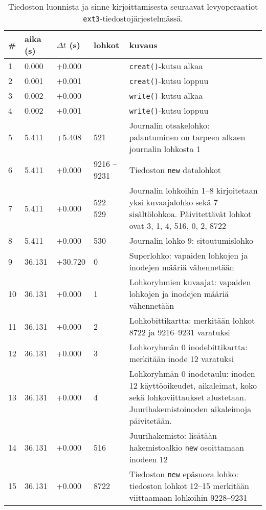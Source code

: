 \begin{table}[H]
\centering
\begin{tabular}{l | l | l | l | p{7cm}}
    \# & aika (s) & $\Delta t$ (s) & lohkot & kuvaus \\ \hline \hline
    1  & 0.000    & +0.000   &              & \texttt{creat()}-kutsu alkaa   \\ \hline %
    2  & 0.001    & +0.001   &              & \texttt{creat()}-kutsu loppuu  \\ \hline %
    3  & 0.002    & +0.000   &              & \texttt{write()}-kutsu alkaa   \\ \hline %
    4  & 0.002    & +0.001   &              & \texttt{write()}-kutsu loppuu  \\ \hline %
    5  & 5.411    & +5.408   & 521          & Journalin otsakelohko: palautuminen on tarpeen alkaen journalin lohkosta 1                       \\ \hline %
    6  & 5.411    & +0.000   & 9216 -- 9231 & Tiedoston \texttt{new} datalohkot                               \\ \hline %
    7  & 5.411    & +0.000   & 522 -- 529   & Journalin lohkoihin 1--8 kirjoitetaan yksi kuvaajalohko sekä 7 sisältölohkoa. Päivitettävät lohkot ovat 3, 1, 4, 516, 0, 2, 8722                       \\ \hline %
    8  & 5.411    & +0.000   & 530          & Journalin lohko 9: sitoutumislohko                       \\ \hline %
    9  & 36.131   & +30.720  & 0            & Superlohko: vapaiden lohkojen ja inodejen määriä vähennetään                     \\ \hline %
    10 & 36.131   & +0.000   & 1            & Lohkoryhmien kuvaajat: vapaiden lohkojen ja inodejen määriä vähennetään                     \\ \hline %
    11 & 36.131   & +0.000   & 2            & Lohkobittikartta: merkitään lohkot 8722 ja 9216--9231 varatuksi                     \\ \hline %
    12 & 36.131   & +0.000   & 3            & Lohkoryhmän 0 inodebittikartta: merkitään inode 12 varatuksi \\ \hline %
    13 & 36.131   & +0.000   & 4            & Lohkoryhmän 0 inodetaulu: inoden 12 käyttöoikeudet, aikaleimat, koko sekä lohkoviittaukset alustetaan. Juurihakemistoinoden aikaleimoja päivitetään.                      \\ \hline %
    14 & 36.131   & +0.000   & 516          & Juurihakemisto: lisätään hakemistoalkio \texttt{new} osoittamaan inodeen 12                 \\ \hline %
    15 & 36.131   & +0.000   & 8722         & Tiedoston \texttt{new} epäsuora lohko: tiedoston lohkot 12--15 merkitään viittaamaan lohkoihin 9228--9231 \\        %
\end{tabular}
\caption{Tiedoston luonnista ja sinne kirjoittamisesta seuraavat levyoperaatiot \texttt{ext3}-tiedostojärjestelmässä.}
\label{TabExt3CreatAndWrite}
\end{table}

